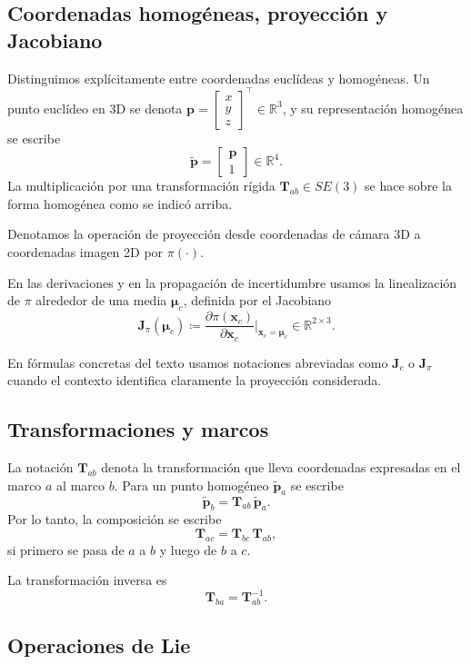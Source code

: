 \subsection{Coordenadas homogéneas, proyección y Jacobiano}

Distinguimos explícitamente entre coordenadas euclídeas y homogéneas. Un punto euclídeo en 3D se denota $\mathbf{p}=\begin{bmatrix}x\\y\\z\end{bmatrix}^\top \in \mathbb{R}^3$, y su representación homogénea se escribe
\[
\tilde{\mathbf{p}} = \begin{bmatrix}\mathbf{p} \\ 1\end{bmatrix} \in \mathbb{R}^4.
\]
La multiplicación por una transformación rígida $\mathbf{T}_{ab}\in SE(3)$ se hace sobre la forma homogénea como se indicó arriba.

Denotamos la operación de proyección desde coordenadas de cámara 3D a coordenadas imagen 2D por $\pi(\cdot)$.

En las derivaciones y en la propagación de incertidumbre usamos la linealización de $\pi$ alrededor de una media $\boldsymbol{\mu}_c$, definida por el Jacobiano
\[
\mathbf{J}_{\pi}(\boldsymbol{\mu}_c) \coloneq \frac{\partial \pi(\mathbf{x}_c)}{\partial \mathbf{x}_c}\Big|_{\mathbf{x}_c=\boldsymbol{\mu}_c} \in \mathbb{R}^{2\times 3}.
\]

En fórmulas concretas del texto usamos notaciones abreviadas como $\mathbf{J}_c$ o $\mathbf{J}_{\pi}$ cuando el contexto identifica claramente la proyección considerada.

\subsection{Transformaciones y marcos}

La notación $\mathbf{T}_{ab}$ denota la transformación que lleva coordenadas expresadas en el marco $a$ al marco $b$. Para un punto homogéneo $\tilde{\mathbf{p}}_a$ se escribe
\[
\tilde{\mathbf{p}}_b = \mathbf{T}_{ab}\,\tilde{\mathbf{p}}_a.
\]
Por lo tanto, la composición se escribe
\[
\mathbf{T}_{ac} = \mathbf{T}_{bc}\,\mathbf{T}_{ab},
\]
si primero se pasa de $a$ a $b$ y luego de $b$ a $c$. 

La transformación inversa es
\[
\mathbf{T}_{ba} = \mathbf{T}_{ab}^{-1}.
\]

\subsection{Operaciones de Lie}

